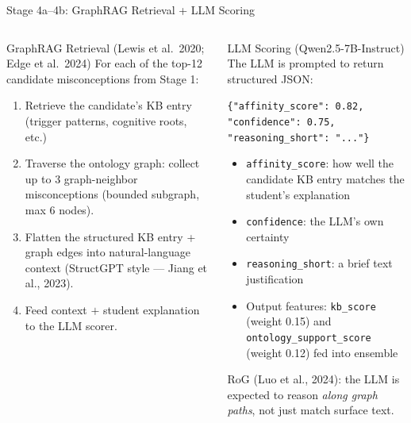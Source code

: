 \documentclass[aspectratio=169]{beamer}
\begin{document}
\begin{frame}{Stage 4a--4b: GraphRAG Retrieval + LLM Scoring}
\begin{columns}[T]
\begin{block}{GraphRAG Retrieval (Lewis et al.\ 2020; Edge et al.\ 2024)}
For each of the top-12 candidate misconceptions from Stage 1:
\begin{enumerate}
  \item Retrieve the candidate's KB entry (trigger patterns, cognitive roots, etc.)
  \item Traverse the ontology graph: collect up to 3 graph-neighbor misconceptions (bounded subgraph, max 6 nodes).
  \item Flatten the structured KB entry + graph edges into natural-language context (StructGPT style --- Jiang et al., 2023).
  \item Feed context $+$ student explanation to the LLM scorer.
\end{enumerate}
\end{block}
\begin{block}{LLM Scoring (Qwen2.5-7B-Instruct)}
The LLM is prompted to return structured JSON:
\begin{center}
\scriptsize
\texttt{\{"affinity\_score": 0.82,}\\
\texttt{\phantom{x}"confidence": 0.75,}\\
\texttt{\phantom{x}"reasoning\_short": "..."\}}
\end{center}
\begin{itemize}
  \item \texttt{affinity\_score}: how well the candidate KB entry matches the student's explanation
  \item \texttt{confidence}: the LLM's own certainty
  \item \texttt{reasoning\_short}: a brief text justification
  \item Output features: \texttt{kb\_score} (weight 0.15) and \texttt{ontology\_support\_score} (weight 0.12) fed into ensemble
\end{itemize}
RoG (Luo et al., 2024): the LLM is expected to reason \textit{along graph paths}, not just match surface text.
\end{block}
\end{columns}
\end{frame}
\end{document}
